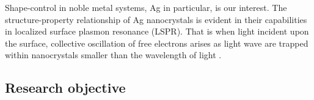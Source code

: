 Shape-control in noble metal systems, Ag in particular, is our interest.
The structure-property relationship of Ag nanocrystals is evident in their capabilities in localized surface plasmon resonance (LSPR).
That is when light incident upon the surface, collective oscillation of free electrons arises as light wave are trapped within nanocrystals smaller than the wavelength of light \cite{Petryayeva_2011}.

\subsection{Research objective}

